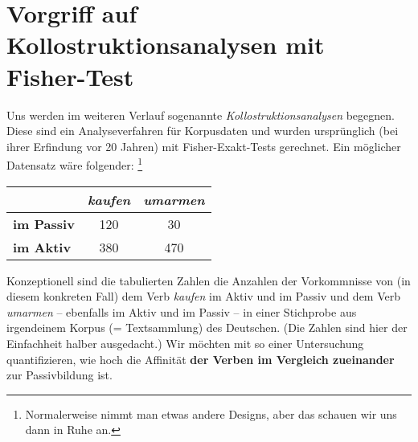 

\section{Vorgriff auf Kollostruktionsanalysen mit Fisher-Test}

Uns werden im weiteren Verlauf sogenannte \textit{Kollostruktionsanalysen} begegnen.
Diese sind ein Analyseverfahren für Korpusdaten und wurden ursprünglich (bei ihrer Erfindung vor 20 Jahren) mit Fisher-Exakt-Tests gerechnet.
Ein möglicher Datensatz wäre folgender:%
\footnote{Normalerweise nimmt man etwas andere Designs, aber das schauen wir uns dann in Ruhe an.}

\begin{center}
\begin{tabular}[h]{|l|c|c|}
  \cline{2-3}
  \multicolumn{1}{c|}{} & \textbf{\textit{kaufen}} & \textbf{\textit{umarmen}} \\\hline
  \textbf{im Passiv} & 120 & 30 \\\hline
  \textbf{im Aktiv} & 380 & 470 \\\hline
\end{tabular}
\end{center}

Konzeptionell sind die tabulierten Zahlen die Anzahlen der Vorkommnisse von (in diesem konkreten Fall) dem Verb \textit{kaufen} im Aktiv und im Passiv und dem Verb \textit{umarmen} -- ebenfalls im Aktiv und im Passiv -- in einer Stichprobe aus irgendeinem Korpus (= Textsammlung) des Deutschen.
(Die Zahlen sind hier der Einfachheit halber ausgedacht.)
Wir möchten mit so einer Untersuchung quantifizieren, wie hoch die Affinität \textbf{der Verben im Vergleich zueinander} zur Passivbildung ist.

